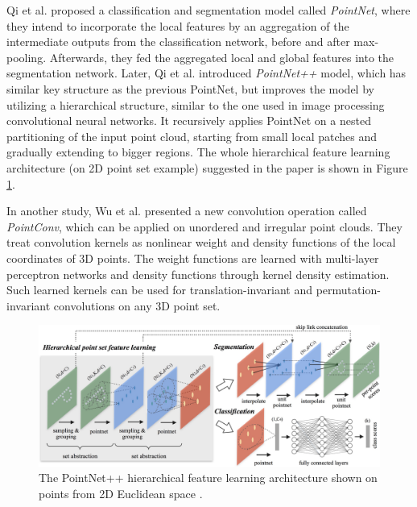 \noindent Qi et al. \cite{DBLP:journals/corr/QiSMG16} proposed a classification and segmentation model called \textit{PointNet}, where they intend to incorporate the local features by an aggregation of the intermediate outputs from the classification network, before and after max-pooling. Afterwards, they fed the aggregated local and global features into the segmentation network. Later, Qi et al. \cite{DBLP:journals/corr/QiYSG17} introduced \textit{PointNet++} model, which has similar key structure as the previous PointNet, but improves the model by utilizing a hierarchical structure, similar to the one used in image processing convolutional neural networks. It recursively applies PointNet on a nested partitioning of the input point cloud, starting from small local patches and gradually extending to bigger regions. The whole hierarchical feature learning architecture (on 2D point set example) suggested in the paper is shown in Figure \ref{fig:Pointnet2}. \par

\vspace{5mm}

\noindent In another study, Wu et al. \cite{DBLP:journals/corr/abs-1811-07246} presented a new convolution operation called \textit{PointConv}, which can be applied on unordered and irregular point clouds. They treat convolution kernels as nonlinear weight and density functions of the local coordinates of 3D points. The weight functions are learned with multi-layer perceptron networks and density functions through kernel density estimation. Such learned kernels can be used for translation-invariant and permutation-invariant convolutions on any 3D point set. \par
\vspace{5mm}
\begin{figure}[H]
\begin{center}
  \includegraphics[width=\textwidth]{images/related_work/pointnet2.jpg}
  \caption[The PointNet++ hierarchical feature learning architecture \cite{DBLP:journals/corr/QiYSG17}.]{The PointNet++ hierarchical feature learning architecture shown on points from 2D Euclidean space \cite{DBLP:journals/corr/QiYSG17}.}
  \label{fig:Pointnet2}
\end{center}
\end{figure}

